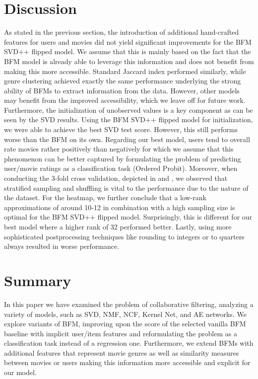 \documentclass[10pt,conference,compsocconf]{IEEEtran}
\begin{document}
    \section{Discussion}
    As stated in the previous section, the introduction of additional hand-crafted features for users and movies did not yield significant improvements for the BFM SVD++ flipped model.
    We assume that this is mainly based on the fact that the BFM model is already able to leverage this information and does not benefit from making this more accessible.
    Standard Jaccard index performed similarly, while genre clustering achieved exactly the same performance underlying the strong ability of BFMs to extract information from the data.
    However, other models may benefit from the improved accessibility, which we leave off for future work.
    Furthermore, the initialization of unobserved values is a key component as can be seen by the SVD results.
    Using the BFM SVD++ flipped model for initialization, we were able to achieve the best SVD test score.
    However, this still performs worse than the BFM on its own.
    Regarding our best model, users tend to overall rate movies rather positively than negatively for which we assume that this phenomenon can be better captured by formulating the problem of predicting user/movie ratings as a classification task (Ordered Probit).
    Moreover, when conducting the 3-fold cross validation, depicted in  and , we observed that stratified sampling and shuffling is vital to the performance due to the nature of the dataset.
    For the heatmap, we further conclude that a low-rank approximations of around 10-12 in combination with a high sampling size is optimal for the BFM SVD++ flipped model.
    Surprisingly, this is different for our best model where a higher rank of 32 performed better.
    Lastly, using more sophisticated postprocessing techniques like rounding to integers or to quarters always resulted in worse performance.

    \section{Summary}

    In this paper we have examined the problem of collaborative filtering, analyzing a variety of models, such as SVD, NMF, NCF, Kernel Net, and AE networks.
    We explore variants of BFM, improving upon the score of the selected vanilla BFM baseline with implicit user/item features and reformulating the problem as a classification task instead of a regression one.
    Furthermore, we extend BFMs with additional features that represent movie genres as well as similarity measures between movies or users making this information more accessible and explicit for our model.
\end{document}
